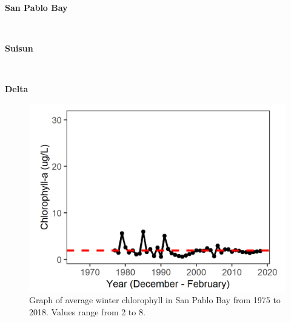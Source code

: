 \documentclass[
]{book}
\begin{document}
\begin{panel-grid}

\begin{columns-nocenter}

\begin{column800}

\textbf{San Pablo Bay}

\end{column800}

\begin{column40}

~

\end{column40}

\begin{column800}

\textbf{Suisun}

\end{column800}

\begin{column40}

~

\end{column40}

\begin{column800}

\textbf{Delta}

\end{column800}

\end{columns-nocenter}

\begin{columns-nocenter}

\begin{column800}

\begin{expand}

\begin{figure}
\includegraphics[width=15.25in]{figures/chla_splwinter} \caption{Graph of average winter chlorophyll in San Pablo Bay from 1975 to 2018. Values range from 2 to 8.}\label{fig:unnamed-chunk-158}
\end{figure}


\end{expand}
\end{column800}
\end{columns-nocenter}
\end{panel-grid}
\end{document}

